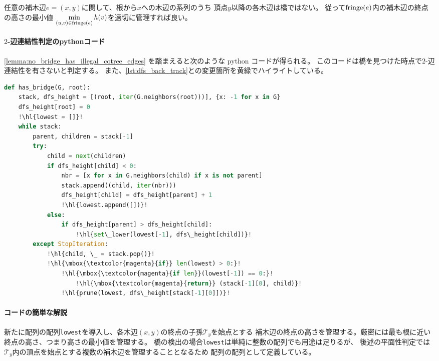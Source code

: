 任意の補木辺$e=(x, y)$に関して、根から$x$への木辺の系列のうち
頂点$y$以降の各木辺は橋ではない。
従って$\operatorname{fringe}(e)$内の補木辺の終点の高さの最小値
$\min\limits_{(u, v)\in\operatorname{fringe}(e)} h(v)$を適切に管理すれば良い。



\paragraph{$2$-辺連結性判定のpythonコード}
\cref{lemma:no_bridge_has_illegal_cotree_edges}%
を踏まえると次のような python コードが得られる。
このコードは橋を見つけた時点で$2$-辺連結性を有さないと判定する。
また、\lstrefname\ref{lst:dfs_back_track}との変更箇所を黄緑でハイライトしている。
\begin{lstlisting}[language=Python, caption=$2$-辺連結性判定{\tt has\_bridge},
                   label=lst:dfs_2_edge_connectivity,escapechar=!]
def has_bridge(G, root):
    stack, dfs_height = [(root, iter(G.neighbors(root)))], {x: -1 for x in G}
    dfs_height[root] = 0
    !\hl{lowest = []}!
    while stack:
        parent, children = stack[-1]
        try:
            child = next(children)
            if dfs_height[child] < 0:
                nbr = [x for x in G.neighbors(child) if x is not parent]
                stack.append((child, iter(nbr)))
                dfs_height[child] = dfs_height[parent] + 1
                !\hl{lowest.append([])}!
            else:
                if dfs_height[parent] > dfs_height[child]:
                    !\hl{set\_lower(lowest[-1], dfs\_height[child])}!
        except StopIteration:
            !\hl{child, \_ = stack.pop()}!
            !\hl{\mbox{\textcolor{magenta}{if}} len(lowest) > 0:}!
                !\hl{\mbox{\textcolor{magenta}{if len}}(lowest[-1]) == 0:}!
                    !\hl{\mbox{\textcolor{magenta}{return}} (stack[-1][0], child)}!
                !\hl{prune(lowest, dfs\_height[stack[-1][0]])}!
\end{lstlisting}

\paragraph{コードの簡単な解説}
新たに配列の配列{\tt lowest}を導入し、各木辺$(x, y)$の終点の子孫${\mathcal T}_y$を始点とする
補木辺の終点の高さを管理する。厳密には最も根に近い終点の高さ、つまり高さの最小値を管理する。
橋の検出の場合{\tt lowest}は単純に整数の配列でも用途は足りるが、
後述の平面性判定では${\mathcal T}_y$内の頂点を始点とする複数の補木辺を管理することとなるため
配列の配列として定義している。


